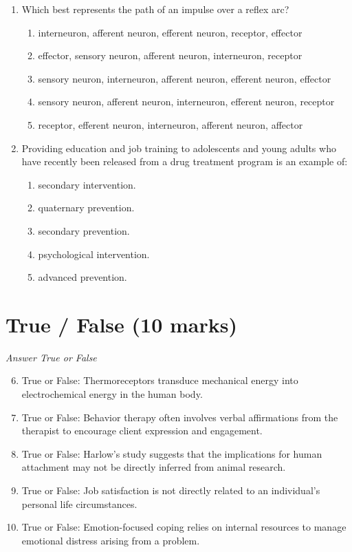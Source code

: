 \documentclass[12pt]{article}
\begin{document}
\begin{enumerate}[label=\arabic*.]
\item Which best represents the path of an impulse over a reflex arc?
\begin{enumerate}[label=(\alph*)]
    \item interneuron, afferent neuron, efferent neuron, receptor, effector
    \item effector, sensory neuron, afferent neuron, interneuron, receptor
    \item sensory neuron, interneuron, afferent neuron, efferent neuron, effector
    \item sensory neuron, afferent neuron, interneuron, efferent neuron, receptor
    \item receptor, efferent neuron, interneuron, afferent neuron, affector
\end{enumerate}
\item Providing education and job training to adolescents and young adults who have recently been released from a drug treatment program is an example of:
\begin{enumerate}[label=(\alph*)]
    \item secondary intervention.
    \item quaternary prevention.
    \item secondary prevention.
    \item psychological intervention.
    \item advanced prevention.
\end{enumerate}
\end{enumerate}

\section*{True / False (10 marks)}
\textit{Answer True or False}
\begin{enumerate}[label=\arabic*.]
\setcounter{enumi}{5}
\item True or False: Thermoreceptors transduce mechanical energy into electrochemical energy in the human body.
\item True or False: Behavior therapy often involves verbal affirmations from the therapist to encourage client expression and engagement.
\item True or False: Harlow's study suggests that the implications for human attachment may not be directly inferred from animal research.
\item True or False: Job satisfaction is not directly related to an individual's personal life circumstances.
\item True or False: Emotion-focused coping relies on internal resources to manage emotional distress arising from a problem.
\end{enumerate}
\end{document}
